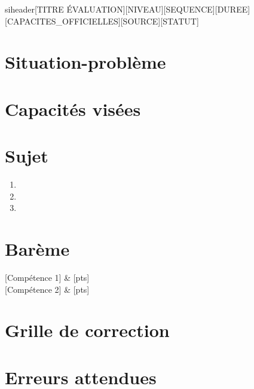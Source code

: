 \documentclass[a4paper,11pt]{article}
\begin{document}
siheader{[TITRE ÉVALUATION]}{[NIVEAU]}{[SEQUENCE]}{[DUREE]}{[CAPACITES\_OFFICIELLES]}{[SOURCE]}{[STATUT]}

\section*{Situation-problème}

\section*{Capacités visées}

\section*{Sujet}
\begin{enumerate}[label=\textbf{Question \arabic*.}, wide=0pt]
  \item
  \item
  \item
\end{enumerate}

\section*{Barème}
\begin{bareme}
  {[Compétence 1]} & [pts] \\
  {[Compétence 2]} & [pts] \\
\end{bareme}

\section*{Grille de correction}

\section*{Erreurs attendues}
\end{document}
